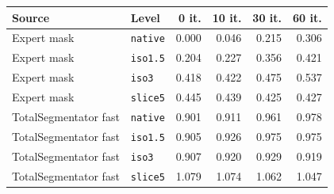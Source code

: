 \begin{tabular}{llrrrr}
\toprule
Source & Level & 0 it. & 10 it. & 30 it. & 60 it. \\
\midrule
Expert mask & \texttt{native} & 0.000 & 0.046 & 0.215 & 0.306 \\
Expert mask & \texttt{iso1.5} & 0.204 & 0.227 & 0.356 & 0.421 \\
Expert mask & \texttt{iso3} & 0.418 & 0.422 & 0.475 & 0.537 \\
Expert mask & \texttt{slice5} & 0.445 & 0.439 & 0.425 & 0.427 \\
\midrule
TotalSegmentator fast & \texttt{native} & 0.901 & 0.911 & 0.961 & 0.978 \\
TotalSegmentator fast & \texttt{iso1.5} & 0.905 & 0.926 & 0.975 & 0.975 \\
TotalSegmentator fast & \texttt{iso3} & 0.907 & 0.920 & 0.929 & 0.919 \\
TotalSegmentator fast & \texttt{slice5} & 1.079 & 1.074 & 1.062 & 1.047 \\
\bottomrule
\end{tabular}

